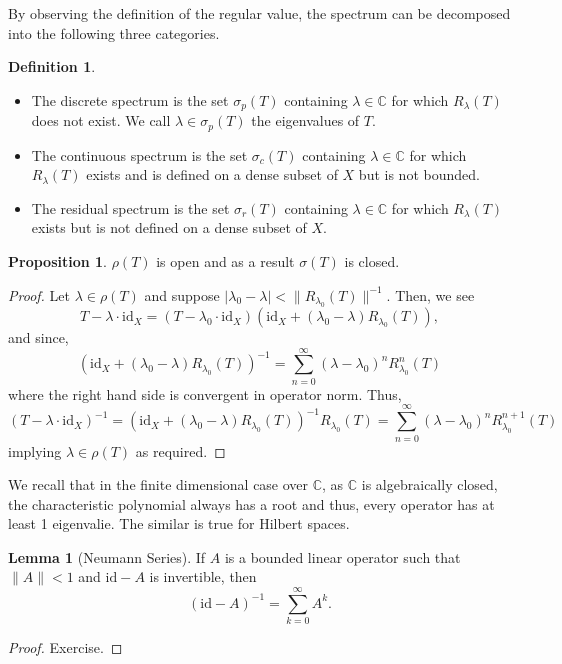 \documentclass[]{article}
\theoremstyle{definition}
\theoremstyle{definition}
\newtheorem{definition}{Definition}[section]
\newtheorem{lemma}{Lemma}[section]
\newtheorem{proposition}{Proposition}[section]
\begin{document}
By observing the definition of the regular value, the spectrum can be decomposed 
into the following three categories.

\begin{definition}\ 
  \begin{itemize}
    \item The discrete spectrum is the set \(\sigma_p(T)\) containing 
      \(\lambda \in \mathbb{C}\) for which \(R_\lambda(T)\) does not exist.
      We call \(\lambda \in \sigma_p(T)\) the eigenvalues of \(T\).
    \item The continuous spectrum is the set \(\sigma_c(T)\) containing 
      \(\lambda \in \mathbb{C}\) for which \(R_\lambda(T)\) exists and is 
      defined on a dense subset of \(X\) but is not bounded.
    \item The residual spectrum is the set \(\sigma_r(T)\) containing 
      \(\lambda \in \mathbb{C}\) for which \(R_\lambda(T)\) exists but is not 
      defined on a dense subset of \(X\).
  \end{itemize}
\end{definition}

\begin{proposition}
  \(\rho(T)\) is open and as a result \(\sigma(T)\) is closed.
\end{proposition}
\begin{proof}
  Let \(\lambda \in \rho(T)\) and suppose \(|\lambda_0 - \lambda| < 
  \|R_{\lambda_0}(T)\|^{-1}\). Then, we see 
  \[T - \lambda \cdot \text{id}_X = (T - \lambda_0 \cdot \text{id}_X)
    (\text{id}_X + (\lambda_0 - \lambda)R_{\lambda_0}(T)),\]
  and since, 
  \[(\text{id}_X + (\lambda_0 - \lambda)R_{\lambda_0}(T))^{-1} = 
    \sum_{n = 0}^\infty (\lambda - \lambda_0)^nR_{\lambda_0}^n(T)\]
  where the right hand side is convergent in operator norm. Thus, 
  \[(T - \lambda \cdot \text{id}_X)^{-1} = 
  (\text{id}_X + (\lambda_0 - \lambda)R_{\lambda_0}(T))^{-1} R_{\lambda_0}(T) 
  = \sum_{n = 0}^\infty (\lambda - \lambda_0)^nR_{\lambda_0}^{n + 1}(T)\] 
  implying \(\lambda \in \rho(T)\) as required.
\end{proof}

We recall that in the finite dimensional case over \(\mathbb{C}\), as 
\(\mathbb{C}\) is algebraically closed, the characteristic polynomial 
always has a root and thus, every operator has at least 1 eigenvalie. 
The similar is true for Hilbert spaces.

\begin{lemma}[Neumann Series]
  If \(A\) is a bounded linear operator such that \(\|A\| < 1\) and 
  \(\text{id} - A\) is invertible, then 
  \[(\text{id} - A)^{-1} = \sum_{k = 0}^\infty A^k.\]
\end{lemma}
\begin{proof}
  Exercise.
\end{proof}
\end{document}
